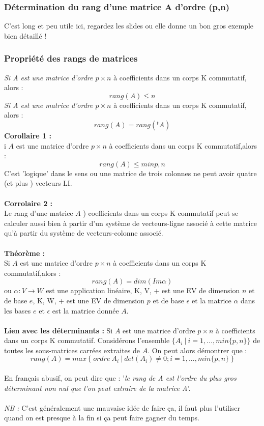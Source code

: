 \documentclass[12pt, a4paper, openany]{article}
\begin{document}
\subsubsection{Détermination du rang d'une matrice A d'ordre (p,n)}
C'est long et peu utile ici, regardez les slides ou elle donne un bon gros exemple bien détaillé !

\subsubsection{Propriété des rangs de matrices}
\textit{Si A est une matrice d'ordre $p \times n$} à coefficients dans un corps K commutatif, alors  :
$$rang(A) \leq n$$
\textit{Si A est une matrice d'ordre $p \times n$} à coefficients dans un corps K commutatif, alors :
$$rang(A) = rang( ^t A)$$
\textbf{Corollaire 1 :}\\
i $A$ est une matrice d'ordre $p \times n$  à coefficients dans un corps K commutatif,alors :
$$rang(A) \leq min{p,n}$$
C'est 'logique' dans le sens ou une matrice de trois colonnes ne peut avoir quatre (et plus ) vecteurs LI.\\
\\
\textbf{Corrolaire 2 :}\\
Le rang d'une matrice $A$ ) coefficients dans un corps K commutatif peut se calculer aussi bien à partir d'un système de vecteurs-ligne associé à cette matrice qu'à partir du système de vecteurs-colonne associé.\\
\\
\textbf{Théorème :}\\
Si $A$ est une matrice d'ordre $p \times n$  à coefficients dans un corps K commutatif,alors :
$$rang(A) = dim(Im \alpha)$$
ou $\alpha : V \rightarrow W$ est une application linéaire, K, V, + est une EV de dimension $n$ et de base $e$, K, W, + est une EV de dimension $p$ et de base $\epsilon$ et la matrice $\alpha$ dans les bases $e$ et $\epsilon$ est la matrice donnée $A$.\\
\\
\textbf{Lien avec les déterminants :}
Si $A$ est une matrice d'ordre $p \times n$  à coefficients dans un corps K commutatif. Considérons l'ensemble $\lbrace A_i\ \vert\ i=1,...,min\{p,n\}\rbrace$ de toutes les sous-matrices carrées extraites de $A$. On peut alors démontrer que :
$$rang(A) = max\ \lbrace\ ordre\ A_i\ \vert\ det(A_i) \neq 0 ; i = 1,...,min\{p,n\}\ \rbrace$$
\\
En français abusif, on peut dire que : '\textit{le rang de A est l'ordre du plus gros déterminant non nul que l'on peut extraire de la matrice A}'.\\\\
\textit{NB :} C'est généralement une mauvaise idée de faire ça, il faut plus l'utiliser quand on est presque à la fin si ça peut faire gagner du temps.
\end{document}
